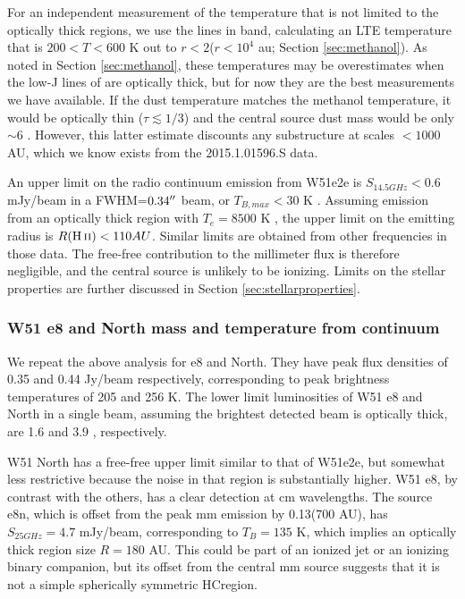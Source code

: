 \documentclass{emulateapj}
\begin{document}
For an independent measurement of the temperature that is not limited to the
optically thick regions, we use the \methanol lines in band, calculating an LTE
temperature that is $200 < T < 600$ K out to $r<2$\arcsec ($r<10^4$ au; Section
\ref{sec:methanol}).  As noted in Section \ref{sec:methanol}, these
temperatures may be overestimates when the low-J lines of \methanol are
optically thick, but for now they are the best measurements we have available.
If the dust temperature matches the methanol temperature, it would be optically
thin ($\tau \lesssim 1/3$) and the central source dust mass would be only
$\sim6$ \msun.  However, this latter estimate discounts any substructure at
scales $<1000$ AU, which we know exists from the 2015.1.01596.S data.

An upper limit on the radio continuum emission from W51e2e is $S_{14.5 GHz} <
0.6$ mJy/beam in a FWHM=$0.34\mbox{$^{\prime\prime}$}$ beam, or $T_{B,max} < 30$ K
\citep{Ginsburg2016b}.  Assuming emission from an optically thick \hii region
with $T_e = 8500$ K \citep{Ginsburg2015a}, the upper limit on the emitting
radius is $R(\hii) < 110 AU$.  Similar limits are obtained from other
frequencies in those data.  The free-free contribution to the millimeter
flux is therefore negligible, and the central source is unlikely to be
ionizing.  Limits on the stellar properties are further discussed in
Section \ref{sec:stellarproperties}.


\subsubsection{W51 e8 and North mass and temperature from continuum}
\label{sec:w51e8andnorth}
We repeat the above analysis for e8 and North.  They have peak flux densities
of 0.35 and 0.44 Jy/beam respectively, corresponding to peak brightness
temperatures of 205 and 256 K.
The lower limit luminosities of W51 e8 and North in a single beam, assuming the
brightest detected beam is optically thick, are 1.6 and 3.9 \lsun,
respectively.


W51 North has a free-free upper limit similar to that of W51e2e, but somewhat less
restrictive because the noise in that region is substantially higher.  W51 e8,
by contrast with the others, has a clear detection at cm wavelengths.  The
source e8n, which is offset from the peak mm emission by 0.13\arcsec (700 AU),
has $S_{25 GHz}=4.7$ mJy/beam, corresponding to $T_B=135$ K, which implies an
optically thick \hii region size $R=180$ AU.  This could be part of an ionized
jet or an ionizing binary companion, but its offset from the central mm source
suggests that it is not a simple spherically symmetric HC\hii region.
\end{document}
